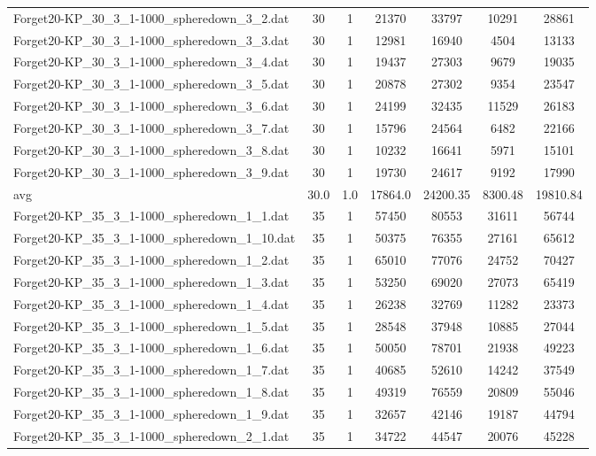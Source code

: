 \begin{table}[!ht]
\begin{tabular}{lcccccc}
Forget20-KP\_30\_3\_1-1000\_spheredown\_3\_2.dat & 30 & 1 & 21370 & 33797 & 10291 & 28861 \\
Forget20-KP\_30\_3\_1-1000\_spheredown\_3\_3.dat & 30 & 1 & 12981 & 16940 & 4504 & 13133 \\
Forget20-KP\_30\_3\_1-1000\_spheredown\_3\_4.dat & 30 & 1 & 19437 & 27303 & 9679 & 19035 \\
Forget20-KP\_30\_3\_1-1000\_spheredown\_3\_5.dat & 30 & 1 & 20878 & 27302 & 9354 & 23547 \\
Forget20-KP\_30\_3\_1-1000\_spheredown\_3\_6.dat & 30 & 1 & 24199 & 32435 & 11529 & 26183 \\
Forget20-KP\_30\_3\_1-1000\_spheredown\_3\_7.dat & 30 & 1 & 15796 & 24564 & 6482 & 22166 \\
Forget20-KP\_30\_3\_1-1000\_spheredown\_3\_8.dat & 30 & 1 & 10232 & 16641 & 5971 & 15101 \\
Forget20-KP\_30\_3\_1-1000\_spheredown\_3\_9.dat & 30 & 1 & 19730 & 24617 & 9192 & 17990 \\
\cline{1-9} avg & 30.0 & 1.0 & 17864.0& 24200.35 & 8300.48& 19810.84\\ \hline
Forget20-KP\_35\_3\_1-1000\_spheredown\_1\_1.dat & 35 & 1 & 57450 & 80553 & 31611 & 56744 \\
Forget20-KP\_35\_3\_1-1000\_spheredown\_1\_10.dat & 35 & 1 & 50375 & 76355 & 27161 & 65612 \\
Forget20-KP\_35\_3\_1-1000\_spheredown\_1\_2.dat & 35 & 1 & 65010 & 77076 & 24752 & 70427 \\
Forget20-KP\_35\_3\_1-1000\_spheredown\_1\_3.dat & 35 & 1 & 53250 & 69020 & 27073 & 65419 \\
Forget20-KP\_35\_3\_1-1000\_spheredown\_1\_4.dat & 35 & 1 & 26238 & 32769 & 11282 & 23373 \\
Forget20-KP\_35\_3\_1-1000\_spheredown\_1\_5.dat & 35 & 1 & 28548 & 37948 & 10885 & 27044 \\
Forget20-KP\_35\_3\_1-1000\_spheredown\_1\_6.dat & 35 & 1 & 50050 & 78701 & 21938 & 49223 \\
Forget20-KP\_35\_3\_1-1000\_spheredown\_1\_7.dat & 35 & 1 & 40685 & 52610 & 14242 & 37549 \\
Forget20-KP\_35\_3\_1-1000\_spheredown\_1\_8.dat & 35 & 1 & 49319 & 76559 & 20809 & 55046 \\
Forget20-KP\_35\_3\_1-1000\_spheredown\_1\_9.dat & 35 & 1 & 32657 & 42146 & 19187 & 44794 \\
Forget20-KP\_35\_3\_1-1000\_spheredown\_2\_1.dat & 35 & 1 & 34722 & 44547 & 20076 & 45228 \\

\end{tabular}
\end{table}
